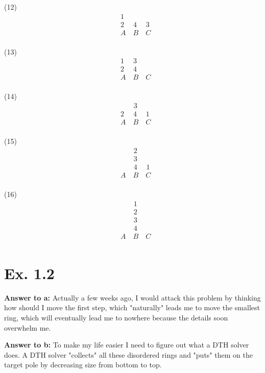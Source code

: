 \documentclass[a4paper,11pt]{article}
\theoremstyle{mytheor}
\begin{document}
(12)
$$
\begin{aligned}
&1\\
&2\quad\; 4\quad\;3\\
&A\quad B\quad C\\
\end{aligned}
$$

(13)
$$
\begin{aligned}
&1\quad\; 3\\
&2\quad\; 4\\
&A\quad B\quad C\\
\end{aligned}
$$

(14)
$$
\begin{aligned}
&\quad\;\;\; 3\\
&2\quad\; 4\quad\;1\\
&A\quad B\quad C\\
\end{aligned}
$$

(15)
$$
\begin{aligned}
&\quad\;\;\; 2\\
&\quad\;\;\; 3\\
&\quad\;\;\; 4\quad\;1\\
&A\quad B\quad C\\
\end{aligned}
$$

(16)
$$
\begin{aligned}
&\quad\;\;\; 1\\
&\quad\;\;\; 2\\
&\quad\;\;\; 3\\
&\quad\;\;\; 4\\
&A\quad B\quad C\\
\end{aligned}
$$

\vspace{1.2in}

\section*{Ex. 1.2}
\textbf{Answer to a:} Actually a few weeks ago, I would attack this problem by thinking how should I move the first step, which "naturally" leads me to move the smallest ring, which will eventually lead me to nowhere because the details soon overwhelm me.
\vspace{1.2in}


\noindent\textbf{Answer to b:} To make my life easier I need to figure out what a DTH solver does. A DTH solver "collects" all these disordered rings and "puts" them on the target pole by decreasing size from bottom to top.
\end{document}
